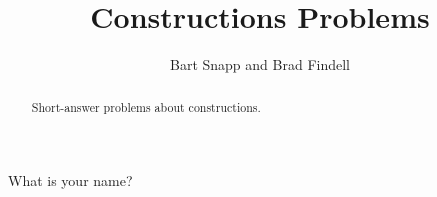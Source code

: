 \documentclass[nooutcomes]{ximera}
\title{Constructions Problems}
\author{Bart Snapp and Brad Findell}
\begin{document}
\begin{abstract}
Short-answer problems about constructions. 
\end{abstract}
\maketitle

\begin{question}
What is your name?
\begin{freeResponse}
\end{freeResponse}
\end{question}


%
\end{document}
